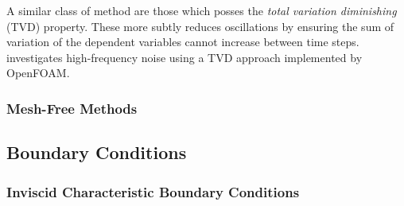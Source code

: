 A similar class of method are those which posses the \emph{total variation diminishing} (TVD) property. These more subtly reduces oscillations by ensuring the sum of variation of the dependent variables cannot increase between time steps. \cite{eigemann2025AmplificationThermoacousticFlame} investigates high-frequency noise using a TVD approach implemented by OpenFOAM.



\subsubsection{Mesh-Free Methods}











\subsection{Boundary Conditions}

\subsubsection{Inviscid Characteristic Boundary Conditions}

